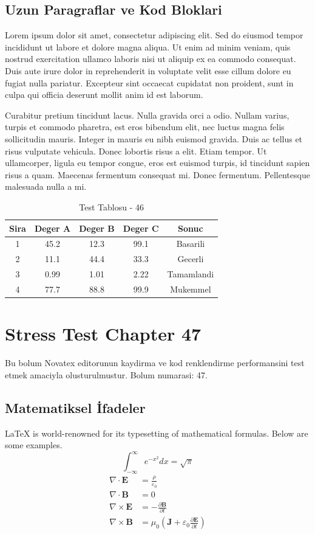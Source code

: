\documentclass[12pt,a4paper]{article}
\begin{document}
\subsection{Uzun Paragraflar ve Kod Bloklari}
Lorem ipsum dolor sit amet, consectetur adipiscing elit. Sed do eiusmod tempor incididunt ut labore et dolore magna aliqua. Ut enim ad minim veniam, quis nostrud exercitation ullamco laboris nisi ut aliquip ex ea commodo consequat. Duis aute irure dolor in reprehenderit in voluptate velit esse cillum dolore eu fugiat nulla pariatur. Excepteur sint occaecat cupidatat non proident, sunt in culpa qui officia deserunt mollit anim id est laborum.

Curabitur pretium tincidunt lacus. Nulla gravida orci a odio. Nullam varius, turpis et commodo pharetra, est eros bibendum elit, nec luctus magna felis sollicitudin mauris. Integer in mauris eu nibh euismod gravida. Duis ac tellus et risus vulputate vehicula. Donec lobortis risus a elit. Etiam tempor. Ut ullamcorper, ligula eu tempor congue, eros est euismod turpis, id tincidunt sapien risus a quam. Maecenas fermentum consequat mi. Donec fermentum. Pellentesque malesuada nulla a mi.

\begin{table}[h!]
\centering
\begin{tabular}{|c|c|c|c|c|}
\hline
\textbf{Sira} & \textbf{Deger A} & \textbf{Deger B} & \textbf{Deger C} & \textbf{Sonuc} \\
\hline
1 & 45.2 & 12.3 & 99.1 & Basarili \\
2 & 11.1 & 44.4 & 33.3 & Gecerli \\
3 & 0.99 & 1.01 & 2.22 & Tamamlandi \\
4 & 77.7 & 88.8 & 99.9 & Mukemmel \\
\hline
\end{tabular}
\caption{Test Tablosu - 46}
\end{table}

\newpage
\section{Stress Test Chapter 47}
Bu bolum Novatex editorunun kaydirma ve kod renklendirme performansini test etmek amaciyla olusturulmustur. Bolum numarasi: 47.

\subsection{Matematiksel İfadeler}
\LaTeX{} is world-renowned for its typesetting of mathematical formulas. Below are some examples.
\begin{equation}
\int_{-\infty}^{\infty} e^{-x^2} dx = \sqrt{\pi}
\end{equation}
\begin{align}
\nabla \cdot \mathbf{E} &= \frac{\rho}{\varepsilon_0} \\
\nabla \cdot \mathbf{B} &= 0 \\
\nabla \times \mathbf{E} &= -\frac{\partial \mathbf{B}}{\partial t} \\
\nabla \times \mathbf{B} &= \mu_0\left(\mathbf{J} + \varepsilon_0 \frac{\partial \mathbf{E}}{\partial t}\right)
\end{align}
\end{document}
